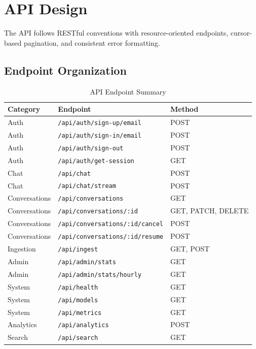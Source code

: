 \documentclass[conference]{IEEEtran}
\begin{document}
\section{API Design}

The API follows RESTful conventions with resource-oriented endpoints, cursor-based pagination, and consistent error formatting.

\subsection{Endpoint Organization}

\begin{table}[t]
\centering
\caption{API Endpoint Summary}
\label{tab:endpoints}
\begin{tabular}{lll}
\toprule
\textbf{Category} & \textbf{Endpoint} & \textbf{Method} \\
\midrule
Auth & \texttt{/api/auth/sign-up/email} & POST \\
Auth & \texttt{/api/auth/sign-in/email} & POST \\
Auth & \texttt{/api/auth/sign-out} & POST \\
Auth & \texttt{/api/auth/get-session} & GET \\
Chat & \texttt{/api/chat} & POST \\
Chat & \texttt{/api/chat/stream} & POST \\
Conversations & \texttt{/api/conversations} & GET \\
Conversations & \texttt{/api/conversations/:id} & GET, PATCH, DELETE \\
Conversations & \texttt{/api/conversations/:id/cancel} & POST \\
Conversations & \texttt{/api/conversations/:id/resume} & POST \\
Ingestion & \texttt{/api/ingest} & GET, POST \\
Admin & \texttt{/api/admin/stats} & GET \\
Admin & \texttt{/api/admin/stats/hourly} & GET \\
System & \texttt{/api/health} & GET \\
System & \texttt{/api/models} & GET \\
System & \texttt{/api/metrics} & GET \\
Analytics & \texttt{/api/analytics} & POST \\
Search & \texttt{/api/search} & GET \\
\bottomrule
\end{tabular}
\end{table}
\end{document}
